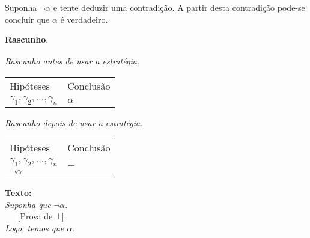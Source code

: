 \begin{ProofStrategy}
Suponha $\neg \alpha$ e tente deduzir uma contradição. A partir desta
contradição pode-se concluir que $\alpha$ é verdadeiro.
\begin{flushleft}
\textbf{Rascunho}.\\
\verb| |\\

\textit{Rascunho antes de usar a estratégia}.
\verb| |\\
\begin{tabular}{ll}
Hipóteses & Conclusão \\
$\gamma_1,\gamma_2,...,\gamma_n$ & $\alpha$\\
\end{tabular}

\textit{Rascunho depois de usar a estratégia}.
\verb| |\\
\begin{tabular}{ll}
Hipóteses & Conclusão \\
$\gamma_1,\gamma_2,...,\gamma_n$ & $\bot$\\
$\neg \alpha$ & \\
\end{tabular}
\end{flushleft}
\begin{flushleft}
\textbf{Texto:}\\
\textit{Suponha que $\neg\alpha$.}\\
\verb|   |[Prova de $\bot$].\\
\textit{Logo, temos que $\alpha$.}
\end{flushleft}
\end{ProofStrategy}

